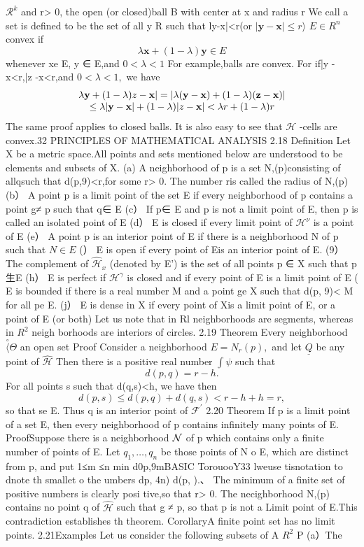 $\textstyle{\mathcal{R}}^{k}$ and r> 0, the open (or closed)ball B with center at x and radius r We call a set is defined to be the set of all y R such that ly-x|<r(or $|\mathbf{y}-\mathbf{x}|\leq r\rangle$ $E\in R^{n}$ convex if $$ \lambda\mathbf{x}+(1-\lambda)\mathbf{y}\in E $$ whenever xe E, y ∈ E,and $0<\lambda<1$ For example,balls are convex. For if|y -x<r,|z -x<r,and $0<\lambda<1,$ we have $$ \begin{array}{c}{{\lambda{\bf y}+(1-\lambda)z-{\bf x}|=|\lambda({\bf y}-{\bf x})+(1-\lambda)({\bf z}-{\bf x})|}}\\ {{\leq\lambda|\mathbf y-{\bf x}|+(1-\lambda)|z-{\bf x}|<\lambda r+(1-\lambda)r}}\end{array} $$ The same proof applies to closed balls. It is also easy to see that $\textstyle{\mathcal{H}}$ -cells are convex.32 PRINCIPLES OF MATHEMATICAL ANALYSIS 2.18 Definition Let X be a metric space.All points and sets mentioned below are understood to be elements and subsets of X. (a) A neighborhood of p is a set N,(p)consisting of allqsuch that d(p,9)<r,for some r> 0. The number ris called the radius of N,(p) (b） A point p is a limit point of the set E if every neighborhood of p contains a point g≠ p such that q∈ E (c） If p∈ E and p is not a limit point of E, then p is called an isolated point of E (d） E is closed if every limit point of ${\mathcal{H}}^{\nu}$ is a point of E (e） A point p is an interior point of E if there is a neighborhood N of p such that $N\in E$ (） E is open if every point of Eis an interior point of E. (9） The complement of ${\widehat{\mathcal{H}}}_{x}$ (denoted by E') is the set of all points p ∈ X such that p生E (h） E is perfect if ${\mathcal{H}}^{\gamma}$ is closed and if every point of E is a limit point of E ( E is bounded if there is a real number M and a point ge X such that d(p, 9)< M for all pe E. (j） E is dense in X if every point of Xis a limit point of E, or a point of E (or both) Let us note that in Rl neighborhoods are segments, whereas in $\textstyle R^{2}$ neigh borhoods are interiors of circles. 2.19 Theorem Every neighborhood $\stackrel{\circ}{\langle}\Theta$ an open set Proof Consider a neighborhood $E=N_{r}(p),$ and let $\underline{{{Q}}}$ be any point of ${\widehat{\mathcal{H}}}$ Then there is a positive real number $\textstyle{\int}\psi$ such that $$ d(p,q)=r-h. $$ For all points s such that d(q,s)<h, we have then $$ d(p,s)\leq d(p,q)+d(q,s)<r-h+h=r, $$ so that se E. Thus q is an interior point of ${\mathcal{F}}^{\prime}$ 2.20 Theorem If p is a limit point of a set E, then every neighborhood of p contains infinitely many points of E. ProofSuppose there is a neighborhood $\textstyle{\cal{N}}$ of p which contains only a finite number of points of E. Let $q_{1},\ldots,q_{n}$ be those points of N o E, which are distinct from p, and put 1≤m ≤n min d0p,9mBASIC TorouooY33 lweuse tisnotation to dnote th smallet o the umbers dp, 4n) d(p, ).、 The minimum of a finite set of positive numbers is clearly posi tive,so that r> 0. The necighborhood N,(p) contains no point q of ${\widehat{\mathcal{H}}}$ such that g ≠ p, so that p is not a Limit point of E.This contradiction establishes th theorem. CorollaryA finite point set has no limit points. 2.21Examples Let us consider the following subsets of A $\textstyle R^{2}$ P (a）The 